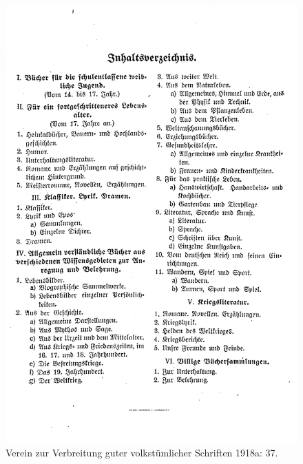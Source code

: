 \documentclass[a4paper,
fontsize=11pt,
oneside,
numbers=noperiodatend,
parskip=half-,
bibliography=totoc,
final
]{scrartcl}
\begin{document}
\begin{figure}
\centering
\includegraphics{img/buecherliste_arbeiterinnen_1.jpg}
\caption{Verein zur Verbreitung guter volkstümlicher Schriften 1918a:
37.}
\end{figure}
\end{document}
